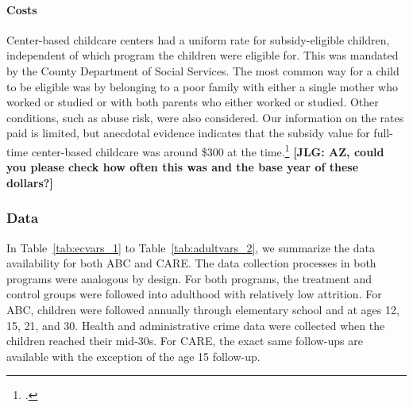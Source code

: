 \begin{appendices}
\paragraph{Costs}

\noindent Center-based childcare centers had a uniform rate for subsidy-eligible children, independent of which program the children were eligible for. This was mandated by the County Department of Social Services. The most common way for a child to be eligible was by belonging to a poor family with either a single mother who worked or studied or with both parents who either worked or studied. Other conditions, such as abuse risk, were also considered. Our information on the rates paid is limited, but anecdotal evidence indicates that the subsidy value for full-time center-based childcare was around \$300 at the time.\footnote{\citet{Kuperman_2015_Clifford-Russell-Interview}.} \textbf{[JLG: AZ, could you please check how often this was and the base year of these dollars?]}

\subsubsection{Data} \label{appendix:data}

In Table~\ref{tab:ecvars_1} to Table~\ref{tab:adultvars_2}, we summarize the data availability for both ABC and CARE. The data collection processes in both programs were analogous by design. For both programs, the treatment and control groups were followed into adulthood with relatively low attrition. For ABC, children were followed annually through elementary school and at ages 12, 15, 21, and 30. Health and administrative crime data were collected when the children reached their mid-30s. For CARE, the exact same follow-ups are available with the exception of the age 15 follow-up.\\




\end{appendices}
